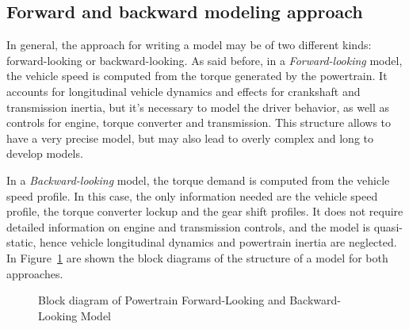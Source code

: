 \subsection{Forward and backward modeling approach}
\label{sub:forward_backward}

In general, the approach for writing a model may be of two different kinds: forward-looking or backward-looking. As said before, in a \emph{Forward-looking} model, the vehicle speed is computed from the torque generated by the powertrain. It accounts for  longitudinal vehicle dynamics and effects for crankshaft and transmission inertia, but it's necessary to model the driver behavior, as well as controls for engine, torque converter and transmission. This structure allows to have a very precise model, but may also lead to overly complex and long to develop models.

In a \emph{Backward-looking} model, the torque demand is computed from the vehicle speed profile. In this case, the only information needed are the vehicle speed profile, the torque converter lockup and the gear shift profiles. It does not require detailed information on engine and transmission controls, and the model is quasi-static, hence vehicle longitudinal dynamics and powertrain inertia are neglected. In Figure~\ref{fig:forward_backward_block_diagram} are shown the block diagrams of the structure of a model for both approaches.

\begin{figure}[ht]
  \caption{Block diagram of Powertrain Forward-Looking and Backward-Looking Model\label{fig:forward_backward_block_diagram} }
\end{figure}

